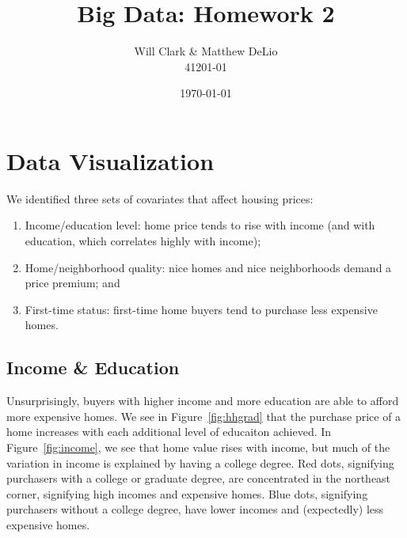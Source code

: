 \documentclass[11pt, fleqn]{article}
\begin{document}
\title{Big Data: Homework 2}
\author{Will Clark \& Matthew DeLio \\ 41201-01}
\date{\today}
\maketitle

\section{Data Visualization}

We identified three sets of covariates that affect housing prices:
\begin{enumerate}
\item Income/education level: home price tends to rise with income (and with education, which correlates highly with income);
\item Home/neighborhood quality: nice homes and nice neighborhoods demand a price premium; and
\item First-time status: first-time home buyers tend to purchase less expensive homes.
\end{enumerate}

\subsection{Income \& Education}

Unsurprisingly, buyers with higher income and more education are able to afford more expensive homes. We see in Figure~\vref{fig:hhgrad} that the purchase price of a home increases with each additional level of educaiton achieved. In Figure~\vref{fig:income}, we see that home value rises with income, but much of the variation in income is explained by having a college degree. Red dots, signifying purchasers with a college or graduate degree, are concentrated in the northeast corner, signifying high incomes and expensive homes. Blue dots, signifying purchasers without a college degree, have lower incomes and (expectedly) less expensive homes.
\end{document}
